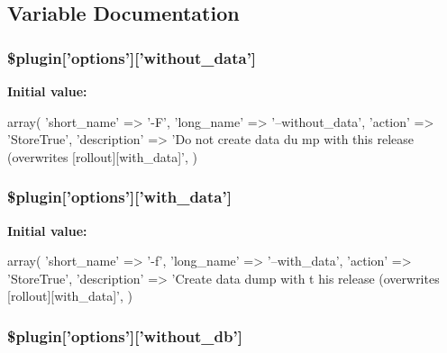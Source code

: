 \subsection{Variable Documentation}
\hypertarget{plugin__release-rollout_8class_8php_a9238d4fa0d55f1851db6015dacb611a7}{
\subsubsection[{\$plugin}]{\setlength{\rightskip}{0pt plus 5cm}\$plugin\mbox{[}'options'\mbox{]}\mbox{[}'without\_\-data'\mbox{]}}}
\label{plugin__release-rollout_8class_8php_a9238d4fa0d55f1851db6015dacb611a7}
{\bfseries Initial value:}
\begin{DoxyCode}
 array(
                                          'short_name'  => '-F',
                                          'long_name'   => '--without_data',
                                          'action'      => 'StoreTrue',
                                          'description' => 'Do not create data du
      mp with this release (overwrites [rollout][with_data]',
                                        )
\end{DoxyCode}
\hypertarget{plugin__release-rollout_8class_8php_aa675b9c634054c778928eff571390ea2}{
\subsubsection[{\$plugin}]{\setlength{\rightskip}{0pt plus 5cm}\$plugin\mbox{[}'options'\mbox{]}\mbox{[}'with\_\-data'\mbox{]}}}
\label{plugin__release-rollout_8class_8php_aa675b9c634054c778928eff571390ea2}
{\bfseries Initial value:}
\begin{DoxyCode}
 array(
                                        'short_name'  => '-f',
                                        'long_name'   => '--with_data',
                                        'action'      => 'StoreTrue',
                                        'description' => 'Create data dump with t
      his release (overwrites [rollout][with_data]',
                                      )
\end{DoxyCode}
\hypertarget{plugin__release-rollout_8class_8php_a86bc0259e2d95a244c343d86849a2fb4}{
\subsubsection[{\$plugin}]{\setlength{\rightskip}{0pt plus 5cm}\$plugin\mbox{[}'options'\mbox{]}\mbox{[}'without\_\-db'\mbox{]}}}
